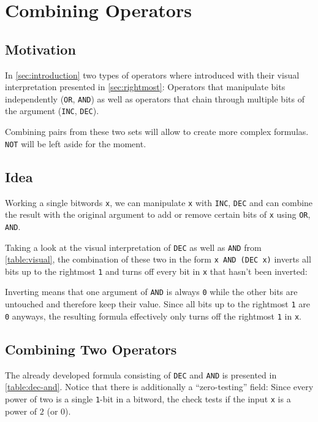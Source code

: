 \section{Combining Operators}\label{sec:combining}

\subsection*{Motivation}
In \autoref{sec:introduction} two types of operators where introduced
with their visual interpretation presented in \autoref{sec:rightmost}:
Operators that manipulate bits independently
(\lstinline$OR$, \lstinline$AND$)
as well as operators that chain through multiple bits of the argument
(\lstinline$INC$, \lstinline$DEC$).

Combining pairs from these two sets will allow
to create more complex formulas.
\lstinline$NOT$ will be left aside for the moment.


\subsection*{Idea}
Working a single bitwords \lstinline$x$, we can
manipulate \lstinline$x$ with \lstinline$INC$, \lstinline$DEC$
and can combine the result with the original argument
to add or remove certain bits of \lstinline$x$
using \lstinline$OR$, \lstinline$AND$.

Taking a look at the visual interpretation
of \lstinline$DEC$ as well as \lstinline$AND$ from \autoref{table:visual},
the combination of these two in the form \lstinline$x AND (DEC x)$
inverts all bits up to the rightmost \lstinline$1$
and turns off every bit in \lstinline$x$ that hasn't been inverted:

Inverting means that one argument of \lstinline$AND$ is always \lstinline$0$
while the other bits are untouched and therefore keep their value.
Since all bits up to the rightmost \lstinline$1$ are \lstinline$0$ anyways,
the resulting formula effectively only turns off the rightmost \lstinline$1$
in \lstinline$x$.


\subsection*{Combining Two Operators}
The already developed formula
consisting of \lstinline$DEC$ and \lstinline$AND$
is presented in \autoref{table:dec-and}.
Notice that there is additionally a ``zero-testing'' field:
Since every power of two is a single \lstinline$1$-bit in a bitword,
the check tests if the input \lstinline$x$ is a power of $2$ (or $0$).

